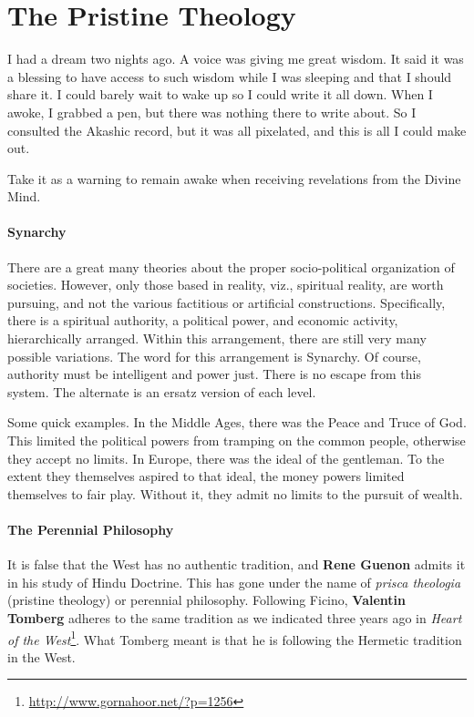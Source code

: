 \section{The Pristine Theology}

I had a dream two nights ago. A voice was giving me great wisdom. It said it was a blessing to have access to such wisdom while I was sleeping and that I should share it. I could barely wait to wake up so I could write it all down. When I awoke, I grabbed a pen, but there was nothing there to write about. So I consulted the Akashic record, but it was all pixelated, and this is all I could make out.

Take it as a warning to remain awake when receiving revelations from the Divine Mind.

\paragraph{Synarchy}
There are a great many theories about the proper socio-political organization of societies. However, only those based in reality, viz., spiritual reality, are worth pursuing, and not the various factitious or artificial constructions. Specifically, there is a spiritual authority, a political power, and economic activity, hierarchically arranged. Within this arrangement, there are still very many possible variations. The word for this arrangement is Synarchy. Of course, authority must be intelligent and power just. There is no escape from this system. The alternate is an ersatz version of each level.

Some quick examples. In the Middle Ages, there was the Peace and Truce of God. This limited the political powers from tramping on the common people, otherwise they accept no limits. In Europe, there was the ideal of the gentleman. To the extent they themselves aspired to that ideal, the money powers limited themselves to fair play. Without it, they admit no limits to the pursuit of wealth.

\paragraph{The Perennial Philosophy}
It is false that the West has no authentic tradition, and \textbf{Rene Guenon} admits it in his study of Hindu Doctrine. This has gone under the name of \emph{prisca theologia} (pristine theology) or perennial philosophy. Following Ficino, \textbf{Valentin Tomberg} adheres to the same tradition as we indicated three years ago in \textit{Heart of the West}\footnote{\url{http://www.gornahoor.net/?p=1256}}. What Tomberg meant is that he is following the Hermetic tradition in the West.

